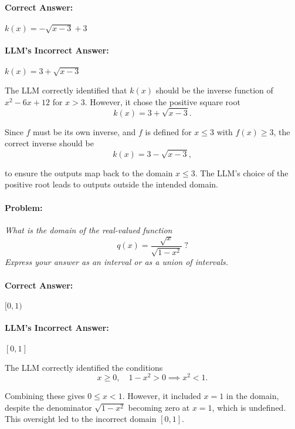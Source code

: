 \documentclass[11pt,a4paper]{article}
\begin{document}
\paragraph{Correct Answer:} \( k(x) = -\sqrt{x - 3} + 3 \)

\paragraph{LLM's Incorrect Answer:} \( k(x) = 3 + \sqrt{x - 3} \)

\begin{tcolorbox}[colback=gray!10, colframe=black, title=\textbf{Step-by-Step Analysis}, fonttitle=\bfseries]
\footnotesize
The LLM correctly identified that \( k(x) \) should be the inverse function of \( x^2 - 6x + 12 \) for \( x > 3 \). However, it chose the positive square root
\[
k(x) = 3 + \sqrt{x - 3}.
\]

Since \( f \) must be its own inverse, and \( f \) is defined for \( x \leq 3 \) with \( f(x) \geq 3 \), the correct inverse should be
\[
k(x) = 3 - \sqrt{x - 3},
\]

to ensure the outputs map back to the domain \( x \leq 3 \). The LLM's choice of the positive root leads to outputs outside the intended domain.
\end{tcolorbox}

\paragraph{Problem:} \textit{What is the domain of the real-valued function
\[
q(x) = \dfrac{\sqrt{x}}{\sqrt{1 - x^2}}~?
\]
Express your answer as an interval or as a union of intervals.}

\paragraph{Correct Answer:} \( [0, 1) \)

\paragraph{LLM's Incorrect Answer:} \( [0, 1] \)

\begin{tcolorbox}[colback=gray!10, colframe=black, title=\textbf{Step-by-Step Analysis}, fonttitle=\bfseries]
\footnotesize
The LLM correctly identified the conditions
\[
x \geq 0, \quad 1 - x^2 > 0 \implies x^2 < 1.
\]

Combining these gives \( 0 \leq x < 1 \). However, it included \( x = 1 \) in the domain, despite the denominator \( \sqrt{1 - x^2} \) becoming zero at \( x = 1 \), which is undefined. This oversight led to the incorrect domain \( [0, 1] \).
\end{tcolorbox}
\end{document}
